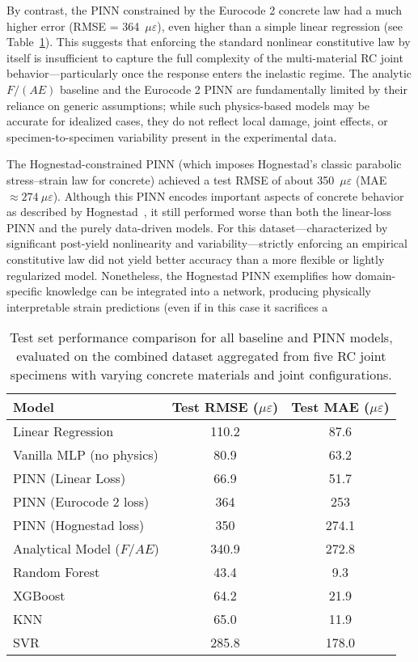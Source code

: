 \documentclass{article}
\begin{document}
By contrast, the PINN constrained by the Eurocode 2 concrete law had a much higher error (RMSE = 364~$\mu\varepsilon$), even higher than a simple linear regression (see Table~\ref{tab:benchmark}). This suggests that enforcing the standard nonlinear constitutive law by itself is insufficient to capture the full complexity of the multi-material RC joint behavior—particularly once the response enters the inelastic regime. The analytic $F/(AE)$ baseline and the Eurocode 2 PINN are fundamentally limited by their reliance on generic assumptions; while such physics-based models may be accurate for idealized cases, they do not reflect local damage, joint effects, or specimen-to-specimen variability present in the experimental data.

The Hognestad-constrained PINN (which imposes Hognestad’s classic parabolic stress–strain law for concrete) achieved a test RMSE of about 350~$\mu\varepsilon$ (MAE $\approx274~\mu\varepsilon$). Although this PINN encodes important aspects of concrete behavior as described by Hognestad~\cite{hognestad1951study}, it still performed worse than both the linear-loss PINN and the purely data-driven models. For this dataset—characterized by significant post-yield nonlinearity and variability—strictly enforcing an empirical constitutive law did not yield better accuracy than a more flexible or lightly regularized model. Nonetheless, the Hognestad PINN exemplifies how domain-specific knowledge can be integrated into a network, producing physically interpretable strain predictions (even if in this case it sacrifices a

\begin{table}[H]
    \centering
    \begin{tabular}{lcc}
        \toprule
        Model & Test RMSE ($\mu\varepsilon$) & Test MAE ($\mu\varepsilon$) \\
        \midrule
        Linear Regression         & 110.2 &  87.6 \\
        Vanilla MLP (no physics)  &  80.9 &  63.2 \\
        PINN (Linear Loss)        & 66.9  & 51.7 \\
        PINN (Eurocode 2 loss)    & 364   & 253   \\
        PINN (Hognestad loss)     & 350 & 274.1  \\
        Analytical Model ($F/AE$) & 340.9 & 272.8 \\
        Random Forest             & 43.4  & 9.3   \\
        XGBoost                   & 64.2  & 21.9  \\
        KNN                       & 65.0  & 11.9  \\
        SVR                       & 285.8 & 178.0 \\
        \bottomrule
    \end{tabular}
   \caption{Test set performance comparison for all baseline and PINN models, evaluated on the combined dataset aggregated from five RC joint specimens with varying concrete materials and joint configurations.}
    \label{tab:benchmark}
\end{table}
\end{document}
